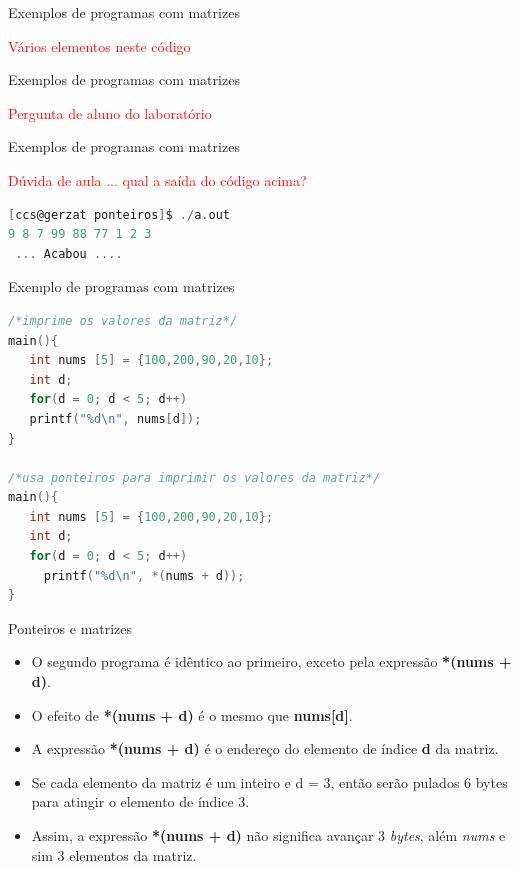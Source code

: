 \begin{frame}{Exemplos de programas com matrizes}



\pause
\textcolor{red}{Vários elementos neste código}

\end{frame}


\begin{frame}{Exemplos de programas com matrizes}



\pause
\textcolor{red}{Pergunta de aluno do  laboratório}

\end{frame}



\begin{frame}{Exemplos de programas com matrizes}


\textcolor{red}{Dúvida de aula ... qual a saída do código acima?}

\pause

\begin{lstlisting}[language=C]
[ccs@gerzat ponteiros]$ ./a.out 
9 8 7 99 88 77 1 2 3 
 ... Acabou ....
\end{lstlisting}

\end{frame}





\begin{frame}{Exemplo de programas com matrizes}
\begin{lstlisting}[language=C]
/*imprime os valores da matriz*/
main(){
   int nums [5] = {100,200,90,20,10};
   int d;
   for(d = 0; d < 5; d++)
   printf("%d\n", nums[d]);
}

/*usa ponteiros para imprimir os valores da matriz*/
main(){
   int nums [5] = {100,200,90,20,10};
   int d;
   for(d = 0; d < 5; d++)
     printf("%d\n", *(nums + d));
}
\end{lstlisting}
\end{frame}

\begin{frame}{Ponteiros e matrizes}  
  \begin{itemize}[<+->]
    \item O segundo programa é idêntico ao primeiro, exceto pela expressão \textbf{*(nums + d)}.
    \item \alert{O efeito de \textbf{*(nums + d)} é o mesmo que \textbf{nums[d]}}.
    \item A expressão \textbf{*(nums + d)} é o endereço do elemento de índice \textbf{d} da matriz.
    \item Se cada elemento da matriz é um inteiro e d = 3, então serão pulados 6 bytes para atingir o elemento de índice 3.
    \item Assim, a expressão \textbf{*(nums + d)} não significa avançar 3 \textit{bytes}, além \textit{nums} e sim 3 elementos da matriz.
  \end{itemize}
\end{frame}




